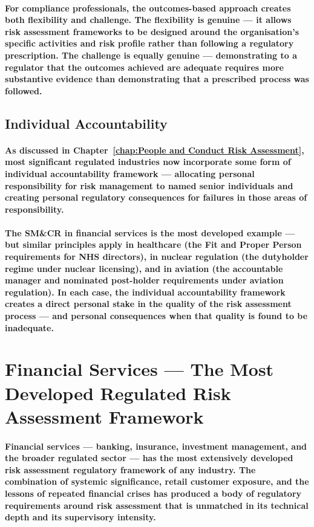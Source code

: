 \paragraph{For compliance professionals, the outcomes-based approach creates both flexibility and challenge. The flexibility is genuine — it allows risk assessment frameworks to be designed around the organisation's specific activities and risk profile rather than following a regulatory prescription. The challenge is equally genuine — demonstrating to a regulator that the outcomes achieved are adequate requires more substantive evidence than demonstrating that a prescribed process was followed.}

\subsection{Individual Accountability}
\paragraph{As discussed in Chapter~\ref{chap:People and Conduct Risk Assessment}, most significant regulated industries now incorporate some form of individual accountability framework — allocating personal responsibility for risk management to named senior individuals and creating personal regulatory consequences for failures in those areas of responsibility.}
\paragraph{The SM\&CR in financial services is the most developed example — but similar principles apply in healthcare (the Fit and Proper Person requirements for NHS directors), in nuclear regulation (the dutyholder regime under nuclear licensing), and in aviation (the accountable manager and nominated post-holder requirements under aviation regulation). In each case, the individual accountability framework creates a direct personal stake in the quality of the risk assessment process — and personal consequences when that quality is found to be inadequate.}

\section{Financial Services — The Most Developed Regulated Risk Assessment Framework}
\paragraph{Financial services — banking, insurance, investment management, and the broader regulated sector — has the most extensively developed risk assessment regulatory framework of any industry. The combination of systemic significance, retail customer exposure, and the lessons of repeated financial crises has produced a body of regulatory requirements around risk assessment that is unmatched in its technical depth and its supervisory intensity.}


